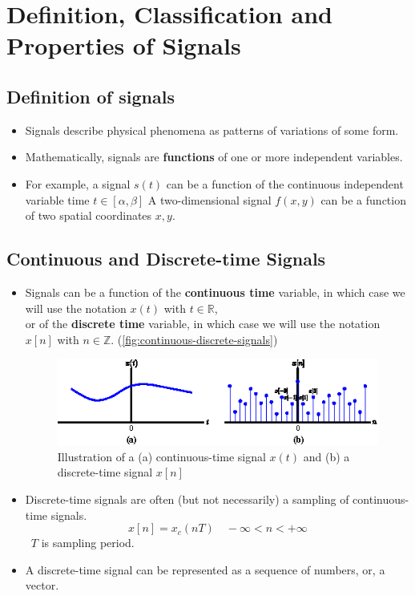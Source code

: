 \section{Definition, Classification and Properties of Signals}
\subsection{Definition of signals}
 \begin{itemize}
    \item  Signals describe physical phenomena as patterns of variations of some form.
    
    \item Mathematically, signals are \textbf{functions} of one or more independent variables.
    
    \item For example, a signal $s(t)$ can be a function of the continuous independent variable time $t \in [\alpha, \beta]$ A two-dimensional signal $f(x, y)$ can be a function of two spatial coordinates $x, y$.
 \end{itemize}

\subsection{Continuous and Discrete-time Signals}
 \begin{itemize}
    \item Signals can be a function of the \textbf{continuous time} variable, in which case we will use the notation $x(t)$ with $t \in \mathbb{R}$, \\
    or of the \textbf{discrete time} variable, in which case we will use the notation $x[n]$ with $n \in \mathbb{Z}$. (\autoref{fig:continuous-discrete-signals})

 
 \begin{figure}[H]
    \centering
    \includegraphics[width = .9\textwidth]{images/continuous_vs_discrete_signals.eps}
    \caption{Illustration of a (a) continuous-time signal $x(t)$ and (b) a discrete-time signal $x[n]$}
    \label{fig:continuous-discrete-signals}
 \end{figure}
 
    \item Discrete-time signals are often (but not necessarily) a sampling of continuous-time signals.
    \[ x[n] = x_{c}(nT) \quad -\infty < n < +\infty \]\ $T$ is sampling period.
 
    \item A discrete-time signal can be represented as a sequence of numbers, or, a vector.
 \end{itemize}

